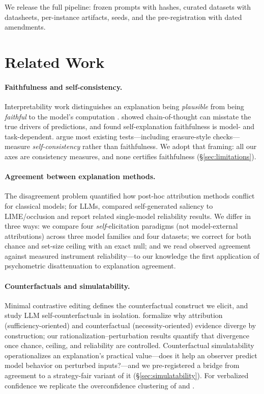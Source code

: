 \documentclass[11pt]{article}
\begin{document}
We release the full pipeline: frozen prompts with hashes, curated datasets with datasheets, per-instance artifacts, seeds, and the pre-registration with dated amendments.

\section{Related Work}
\label{sec:related}

\paragraph{Faithfulness and self-consistency.}
Interpretability work distinguishes an explanation being \emph{plausible} from being \emph{faithful} to the model's computation \citep{jacovi2020towards,lyu2024towards}. \citet{turpin2023language} showed chain-of-thought can misstate the true drivers of predictions, and \citet{madsen2024selfexplanations} found self-explanation faithfulness is model- and task-dependent. \citet{parcalabescu2024measuring} argue most existing tests---including erasure-style checks---measure \emph{self-consistency} rather than faithfulness. We adopt that framing: all our axes are consistency measures, and none certifies faithfulness (\S\ref{sec:limitations}).

\paragraph{Agreement between explanation methods.}
The disagreement problem \citep{krishna2022disagreement} quantified how post-hoc attribution methods conflict for classical models; for LLMs, \citet{huang2023can} compared self-generated saliency to LIME/occlusion and \citet{randl2024evaluating} report related single-model reliability results. We differ in three ways: we compare four \emph{self}-elicitation paradigms (not model-external attributions) across three model families and four datasets; we correct for both chance and set-size ceiling with an exact null; and we read observed agreement against measured instrument reliability---to our knowledge the first application of psychometric disattenuation to explanation agreement.

\paragraph{Counterfactuals and simulatability.}
Minimal contrastive editing \citep{ross2021explaining} defines the counterfactual construct we elicit, and \citet{dehghanighobadi2025can} study LLM self-counterfactuals in isolation. \citet{mothilal2021towards} formalize why attribution (sufficiency-oriented) and counterfactual (necessity-oriented) evidence diverge by construction; our rationalization--perturbation results quantify that divergence once chance, ceiling, and reliability are controlled. Counterfactual simulatability \citep{chen2024models} operationalizes an explanation's practical value---does it help an observer predict model behavior on perturbed inputs?---and we pre-registered a bridge from agreement to a strategy-fair variant of it (\S\ref{sec:simulatability}). For verbalized confidence we replicate the overconfidence clustering of \citet{xiong2024can} and \citet{tian2023just}.
\end{document}
